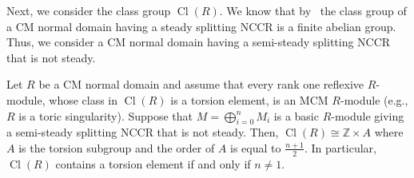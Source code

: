 \documentclass[ALCO,ThmDefs,Unicode]{cedram}
\newcommand{\ZZ}{\mathbb{Z}}
\DeclareMathOperator{\Cl}{Cl}
\begin{document}

Next, we consider the class group $\Cl(R)$. We know that by~\cite[Proposition~2.8]{IN} the class group of a CM normal domain having a steady splitting NCCR is a finite abelian group. Thus, we consider a CM normal domain having a semi-steady splitting NCCR that is not steady.

\begin{theo}\label{class_semi_steady}
Let $R$ be a CM normal domain and assume that every rank one reflexive $R$-module, whose class in $\Cl(R)$ is a torsion element, is an MCM $R$-module (e.g., $R$ is a toric singularity). Suppose that $M=\bigoplus_{i=0}^nM_i$ is a basic $R$-module giving a semi-steady splitting NCCR that is not steady. Then, $\Cl(R)\cong\ZZ\times A$ where $A$ is the torsion subgroup and the order of $A$ is equal to $\frac{n+1}{2}$. In particular, $\Cl(R)$ contains a torsion element if and only if $n\neq 1$.
\end{theo}
\end{document}

